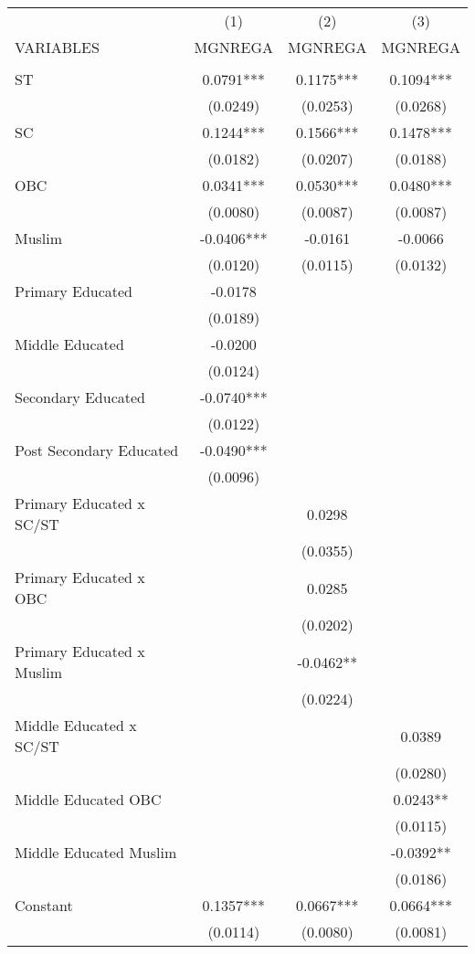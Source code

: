 \documentclass{article}
\begin{document}
\newpage
\begin{table}[]
\small

    \centering
    \begin{tabular}{lccc} \hline
 & (1) & (2) & (3) \\
VARIABLES & MGNREGA & MGNREGA & MGNREGA \\ \hline\hline
 &  &  &  \\
ST & 0.0791*** & 0.1175*** & 0.1094*** \\
 & (0.0249) & (0.0253) & (0.0268) \\
SC & 0.1244*** & 0.1566*** & 0.1478*** \\
 & (0.0182) & (0.0207) & (0.0188) \\
OBC & 0.0341*** & 0.0530*** & 0.0480*** \\
 & (0.0080) & (0.0087) & (0.0087) \\
Muslim & -0.0406*** & -0.0161 & -0.0066 \\
 & (0.0120) & (0.0115) & (0.0132) \\
Primary Educated & -0.0178 &  &  \\
 & (0.0189) &  &  \\
Middle Educated & -0.0200 &  &  \\
 & (0.0124) &  &  \\
Secondary Educated & -0.0740*** &  &  \\
 & (0.0122) &  &  \\
Post Secondary Educated & -0.0490*** &  &  \\
 & (0.0096) &  &  \\
Primary Educated x SC/ST &  & 0.0298 &  \\
 &  & (0.0355) &  \\
Primary Educated x OBC &  & 0.0285 &  \\
 &  & (0.0202) &  \\
Primary Educated x Muslim &  & -0.0462** &  \\
 &  & (0.0224) &  \\
Middle Educated x SC/ST &  &  & 0.0389 \\
 &  &  & (0.0280) \\
Middle Educated OBC &  &  & 0.0243** \\
 &  &  & (0.0115) \\
Middle Educated Muslim &  &  & -0.0392** \\
 &  &  & (0.0186) \\
Constant & 0.1357*** & 0.0667*** & 0.0664*** \\
 & (0.0114) & (0.0080) & (0.0081) \\\hline

\end{tabular}
\end{table}
\end{document}
